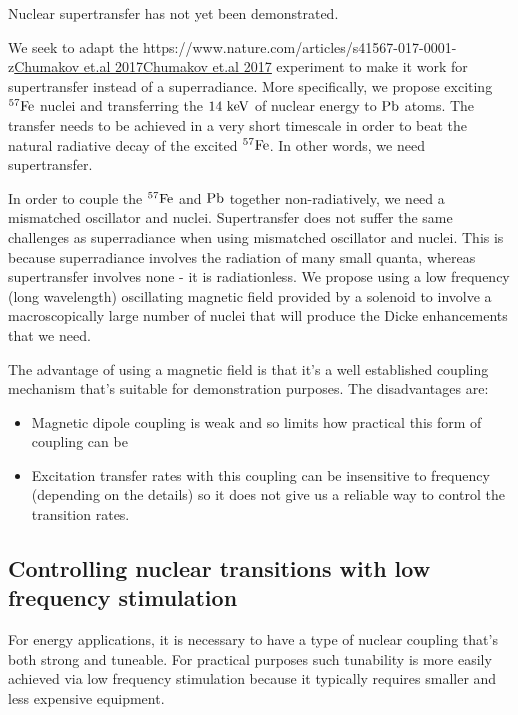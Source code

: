 \documentclass[
]{article}
\let\oldhref\href
\renewcommand{\href}[2]{\ifx#1\urlprefix\oldhref{#1}{#2}\else\uline{\oldhref{#1}{#2}}\fi}
\renewcommand{\[}{\begin{equation}}
\renewcommand{\]}{\end{equation}}
\providecommand{\tightlist}{%
  \setlength{\itemsep}{0pt}\setlength{\parskip}{0pt}}
\begin{document}
Nuclear supertransfer has not yet been demonstrated.

We seek to adapt the
\href{https://www.nature.com/articles/s41567-017-0001-z}{Chumakov et.al
2017} experiment to make it work for supertransfer instead of a
superradiance. More specifically, we propose exciting \(\rm ^{57}Fe\)
nuclei and transferring the \(14 \ \rm keV\) of nuclear energy to
\(\rm Pb\) atoms. The transfer needs to be achieved in a very short
timescale in order to beat the natural radiative decay of the excited
\(\rm ^{57}Fe\). In other words, we need supertransfer.

In order to couple the \(\rm ^{57}Fe\) and \(\rm Pb\) together
non-radiatively, we need a mismatched oscillator and nuclei.
Supertransfer does not suffer the same challenges as superradiance when
using mismatched oscillator and nuclei. This is because superradiance
involves the radiation of many small quanta, whereas supertransfer
involves none - it is radiationless. We propose using a low frequency
(long wavelength) oscillating magnetic field provided by a solenoid to
involve a macroscopically large number of nuclei that will produce the
Dicke enhancements that we need.

The advantage of using a magnetic field is that it's a well established
coupling mechanism that's suitable for demonstration purposes. The
disadvantages are:

\begin{itemize}
\tightlist
\item
  Magnetic dipole coupling is weak and so limits how practical this form
  of coupling can be
\item
  Excitation transfer rates with this coupling can be insensitive to
  frequency (depending on the details) so it does not give us a reliable
  way to control the transition rates.
\end{itemize}

\subsection{Controlling nuclear transitions with low frequency
stimulation}\label{controlling-nuclear-transitions-with-low-frequency-stimulation}

For energy applications, it is necessary to have a type of nuclear
coupling that's both strong and tuneable. For practical purposes such
tunability is more easily achieved via low frequency stimulation because
it typically requires smaller and less expensive equipment.
\end{document}
